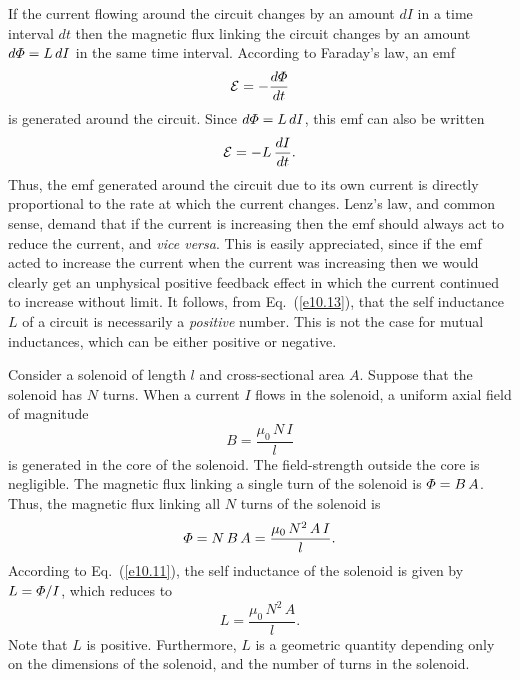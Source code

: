 If the current flowing around the circuit changes by an
amount $dI$ in a time interval $dt$ then the
magnetic flux linking the circuit changes by an amount $d{\mit\Phi}
= L\,d I$ in the same time interval. According to
Faraday's law, an emf
\begin{equation}
{\cal E} = - \frac{d{\mit\Phi}}{d t}
\end{equation}
is generated around the circuit. Since  $d{\mit\Phi}
= L\,d I$,
this emf can also be written
\begin{equation}\label{e10.13}
{\cal E} = - L\,\frac{dI}{d t}.
\end{equation}
Thus, the emf generated around the circuit due to its own current is directly
proportional to the rate at which the current changes. Lenz's law, and
common sense, demand that if the current is increasing then the emf should
always 
act to reduce the current, and {\em vice versa}. This is easily appreciated,
since if
 the emf acted to increase the
current when the current was increasing then we would clearly get an unphysical
positive feedback 
effect in which the current continued to increase without limit. It follows, from
Eq.~(\ref{e10.13}), that the
self inductance $L$ of a circuit is necessarily a {\em positive} number. This
is not the case for mutual inductances, which can be either positive or negative. 

Consider a solenoid of length $l$ and cross-sectional
area $A$. Suppose that the solenoid has $N$ turns.
When a current $I$ flows in the solenoid, a uniform axial field of magnitude
\begin{equation}\label{e10.19}
B = \frac{\mu_0\,N\,I}{l}
\end{equation}
is generated in the core of the solenoid. The field-strength outside the core
is
negligible. The magnetic flux linking a single turn of the solenoid is
${\mit\Phi} = B\,A$. Thus, the magnetic flux linking all $N$ turns of
the solenoid is
\begin{equation}
{\mit\Phi}= N\,B\,A = \frac{\mu_0\,N^2\,A\,I}{l}.
\end{equation}
According to Eq.~(\ref{e10.11}), the self inductance of the solenoid is given by
$L= {\mit\Phi}/I$, which reduces to
\begin{equation}\label{e10.21}
L = \frac{\mu_0\,N^2\,A}{l}.
\end{equation}
Note that $L$ is positive. Furthermore, $L$ is a geometric quantity depending
only on the dimensions of the solenoid, and the number of turns in the solenoid.

